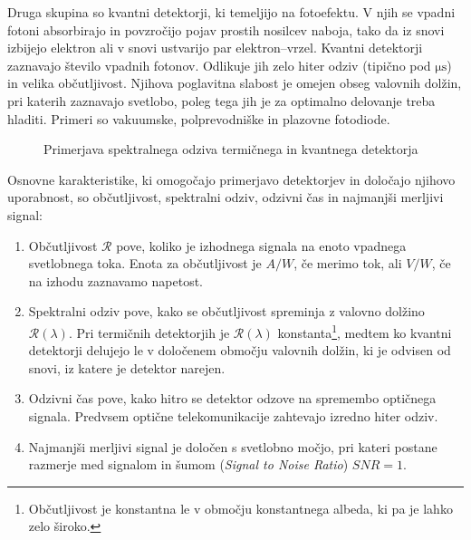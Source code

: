 Druga skupina so kvantni detektorji, ki temeljijo na fotoefektu.
V njih se vpadni fotoni absorbirajo in povzročijo pojav prostih nosilcev naboja, 
tako da iz snovi izbijejo elektron ali v snovi ustvarijo par elektron--vrzel. Kvantni 
detektorji zaznavajo število vpadnih fotonov. Odlikuje jih zelo hiter odziv 
(tipično pod $\si{\micro\second}$)
in velika občutljivost. Njihova poglavitna slabost je omejen obseg valovnih dolžin,
pri katerih zaznavajo svetlobo, poleg tega jih je za optimalno delovanje treba 
hladiti. Primeri so vakuumske, polprevodniške in plazovne fotodiode.
\begin{figure}[h]
\centering
\def\svgwidth{60truemm} 

\caption{Primerjava spektralnega odziva termičnega in kvantnega detektorja}
\label{fig:shemaTermKv}
\end{figure}

Osnovne karakteristike, ki omogočajo primerjavo detektorjev in določajo njihovo uporabnost,
so občutljivost, spektralni odziv, odzivni čas in najmanjši merljivi signal:

\begin{enumerate}
\item Občutljivost $\mathcal{R}$ pove, koliko je izhodnega signala 
na enoto vpadnega svetlobnega toka. Enota za občutljivost je $\si{A/W}$, če merimo tok, ali 
$\si{V/W}$, če na izhodu zaznavamo napetost. 
\item Spektralni odziv pove, kako se občutljivost spreminja z valovno dolžino $\mathcal{R}(\lambda)$.
Pri termičnih detektorjih je $\mathcal{R}(\lambda)$ konstanta\footnote{Občutljivost je konstantna
le v območju konstantnega albeda, ki pa je lahko zelo široko.}, medtem ko kvantni detektorji 
delujejo le v določenem območju valovnih dolžin, ki je odvisen od snovi, 
iz katere je detektor narejen. 
\item Odzivni čas pove, kako hitro se detektor odzove na spremembo optičnega signala. Predvsem 
optične telekomunikacije zahtevajo izredno hiter odziv.
\item Najmanjši merljivi signal je določen s svetlobno močjo, pri kateri postane razmerje med 
signalom in šumom ({\it Signal to Noise Ratio}) $SNR = 1$. 
\end{enumerate}

